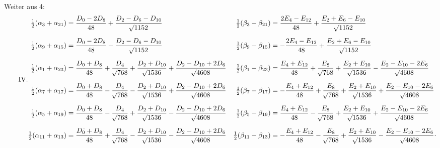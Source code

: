 \clearpage
\begin{landscape}
\begingroup
\fontsize{9.5}{12}\selectfont
{}
\renewcommand{\headrulewidth}{0pt}
\makeatletter\tagsleft@true\let\veqno\@@leqno\makeatother
\setlength{\lineskip}{4pt}\setlength{\lineskiplimit}{4pt}
\newcommand{\VthreeRaisedPoint}{\mathord{\text{\raisebox{.5ex}{.}}}}
\newcommand{\VthreeDZeroMark}{\mathord{\text{\makebox[0pt][l]{\kern-.2em\raisebox{1.25ex}{\rotatebox{10}{\rule{.04em}{.24ex}}}}}}}
\par\noindent\hspace*{\parindent}Weiter aus 4:
\[
\tag*{IV.}
\begin{aligned}
\tfrac12(\alpha_3+\alpha_{21})&=\frac{D_0-2D_8}{48}+\frac{D_2-D_6-D_{10}}{\BareRoot{1152}}&\;\tfrac12(\beta_3-\beta_{21})&=\frac{2E_4-E_{12}}{48}+\frac{E_2+E_6-E_{10}}{\BareRoot{1152}}\\[6pt]
\tfrac12(\alpha_9+\alpha_{15})&=\frac{D_0-2D_8}{48}-\frac{D_2-D_6-D_{10}}{\BareRoot{1152}}&\tfrac12(\beta_9-\beta_{15})&=-\frac{2E_4-E_{12}}{48}+\frac{E_2+E_6-E_{10}}{\BareRoot{1152}}\\[6pt]
\tfrac12(\alpha_1+\alpha_{23})&=\frac{D_0+D_8}{48}+\frac{D_4}{\BareRoot{768}}+\frac{D_2+D_{10}}{\BareRoot{1536}}+\frac{D_2-D_{10}+2D_6}{\BareRoot{4608}}&\tfrac12(\beta_1-\beta_{23})&=\frac{E_4+E_{12}}{48}+\frac{E_8}{\BareRoot{768}}+\frac{E_2+E_{10}}{\BareRoot{1536}}-\frac{E_2-E_{10}-2E_6}{\BareRoot{4608}}\\[6pt]
\tfrac12(\alpha_7+\alpha_{17})&=\frac{D_0+D_8}{48}-\frac{D_4}{\BareRoot{768}}-\frac{D_2+D_{10}}{\BareRoot{1536}}+\frac{D_2-D_{10}+2D_6}{\BareRoot{4608}}&\tfrac12(\beta_7-\beta_{17})&=-\frac{E_4+E_{12}}{48}+\frac{E_8}{\BareRoot{768}}+\frac{E_2+E_{10}}{\BareRoot{1536}}+\frac{E_2-E_{10}-2E_6}{\BareRoot{4608}}\\[6pt]
\tfrac12(\alpha_5+\alpha_{19})&=\frac{D_0+D_8}{48}-\frac{D_4}{\BareRoot{768}}+\frac{D_2+D_{10}}{\BareRoot{1536}}-\frac{D_2-D_{10}+2D_6}{\BareRoot{4608}}&\tfrac12(\beta_5-\beta_{19})&=\frac{E_4+E_{12}}{48}-\frac{E_8}{\BareRoot{768}}+\frac{E_2+E_{10}}{\BareRoot{1536}}+\frac{E_2-E_{10}-2E_6}{\BareRoot{4608}}\\[6pt]
\tfrac12(\alpha_{11}+\alpha_{13})&=\frac{D_0\VthreeDZeroMark+D_8}{48}+\frac{D_4}{\BareRoot{768}}-\frac{D_2+D_{10}}{\BareRoot{1536}}-\frac{D_2-D_{10}+2D_6}{\BareRoot{4608}}&\tfrac12(\beta_{11}-\beta_{13})&=-\frac{E_4+E_{12}}{48}-\frac{E_8}{\BareRoot{768}}+\frac{E_2+E_{10}}{\BareRoot{1536}}-\frac{E_2-E_{10}-2E_6}{\BareRoot{4608}}\VthreeRaisedPoint
\end{aligned}
\]
\clearpage
\endgroup
\end{landscape}

